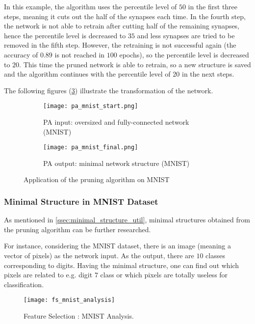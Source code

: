 In this example, the algorithm uses the percentile level of $ 50 $ in the first three steps, meaning it cuts out the half of the synapses each time. In the fourth step, the network is not able to retrain after cutting half of the remaining synapses, hence the percentile level is decreased to $ 35 $ and less synapses are tried to be removed in the fifth step. However, the retraining is not successful again (the accuracy of $ 0.89 $ is not reached in $ 100 $ epochs), so the percentile level is decreased to $ 20 $. This time the pruned network is able to retrain, so a new structure is saved and the algorithm continues with the percentile level of $ 20 $ in the next steps.

The following figures (\ref{img:pa_mnist_morph}) illustrate the transformation of the network.
\begin{figure}[H]
\centering
\begin{subfigure}{0.45\textwidth}
  \centering
  \texttt{[image: pa\_mnist\_start.png]}
  \caption{PA input: oversized and fully-connected network (MNIST)}
  \label{img:pa_mnist_start}
\end{subfigure}%
\begin{subfigure}{0.45\textwidth}
  \centering
  \texttt{[image: pa\_mnist\_final.png]}
  \caption{PA output: minimal network structure (MNIST)}
  \label{img:pa_mnist_final}
\end{subfigure}
\caption{Application of the pruning algorithm on MNIST}
\label{img:pa_mnist_morph}
\end{figure}

\subsubsection{Minimal Structure in MNIST Dataset} \label{sssec:mnist_analysis}
As mentioned in \cref{ssec:minimal_structure_util}, minimal structures obtained from the pruning algorithm can be further researched.

For instance, considering the MNIST dataset, there is an image (meaning a vector of pixels) as the network input. As the output, there are $ 10 $ classes corresponding to digits. Having the minimal structure, one can find out which pixels are related to e.g. digit $ 7 $ class or which pixels are totally useless for classification.

\begin{figure}[H]
  \centering
  \texttt{[image: fs\_mnist\_analysis]}
  \caption{Feature Selection : MNIST Analysis.}
  \label{fig:amter_cm_noisy}
\end{figure}

